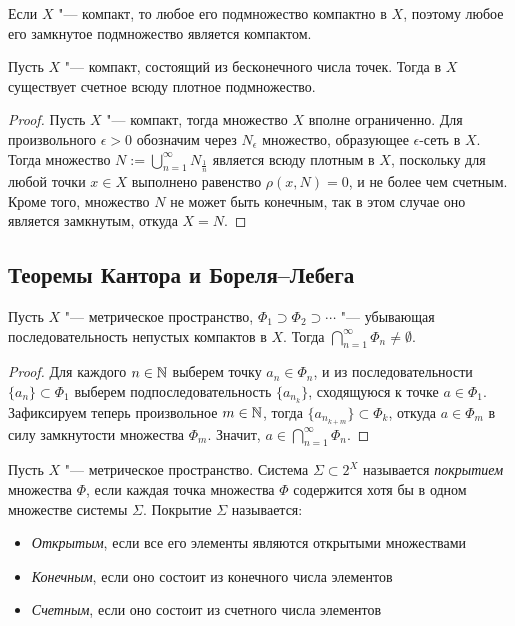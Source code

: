 \begin{note}
    Если $X$ "--- компакт, то любое его подмножество компактно в $X$, поэтому любое его замкнутое подмножество является компактом.
\end{note}

\begin{theorem}\label{countabledensetheo}
    Пусть $X$ "--- компакт, состоящий из бесконечного числа точек. Тогда в $X$ существует счетное всюду плотное подмножество.
\end{theorem}

\begin{proof}
    Пусть $X$ "--- компакт, тогда множество $X$ вполне ограниченно. Для произвольного $\epsilon > 0$ обозначим через $N_\epsilon$ множество, образующее $\epsilon$-сеть в $X$. Тогда множество $N := \bigcup_{n=1}^{\infty}N_{\frac1{n}}$ является всюду плотным в $X$, поскольку для любой точки $x\in X$ выполнено равенство $\rho(x, N)=0$, и не более чем счетным. Кроме того, множество $N$ не может быть конечным, так в этом случае оно является замкнутым, откуда $X = N$.
\end{proof}

\subsection{Теоремы Кантора и Бореля--Лебега}

\begin{theorem}[Кантора]
    Пусть $X$ "--- метрическое пространство, $\Phi_1\supset \Phi_2\supset\dotsb$ "--- убывающая последовательность непустых компактов в $X$. Тогда $\bigcap_{n=1}^{\infty}\Phi_n \ne \emptyset$.
\end{theorem}

\begin{proof}
    Для каждого $n \in \mathbb{N}$ выберем точку $a_n \in \Phi_n$, и из последовательности $\lbrace a_n\rbrace \subset \Phi_1$ выберем подпоследовательность $\lbrace a_{n_k}\rbrace$, сходящуюся к точке $a \in \Phi_1$. Зафиксируем теперь произвольное $m \in \mathbb{N}$, тогда $\{a_{n_{k + m}}\} \subset \Phi_k$, откуда $a \in \Phi_m$ в силу замкнутости множества $\Phi_m$. Значит, $a \in \bigcap_{n=1}^{\infty}\Phi_n$.
\end{proof}

\begin{definition}
    Пусть $X$ "--- метрическое пространство. Система $\Sigma \subset 2^X$ называется \textit{покрытием} множества $\Phi$, если каждая точка множества $\Phi$ содержится хотя бы в одном множестве системы $\Sigma$. Покрытие $\Sigma$ называется:
    \begin{itemize}
        \item \textit{Открытым}, если все его элементы являются открытыми множествами
        \item \textit{Конечным}, если оно состоит из конечного числа элементов
        \item \textit{Счетным}, если оно состоит из счетного числа элементов
    \end{itemize}
\end{definition}

